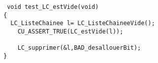 \begin{verbatim}
 void test_LC_estVide(void)
{
  LC_ListeChainee l= LC_ListeChaineeVide();
	CU_ASSERT_TRUE(LC_estVide(l));

	LC_supprimer(&l,BAD_desallouerBit);
}


\end{verbatim}
 
